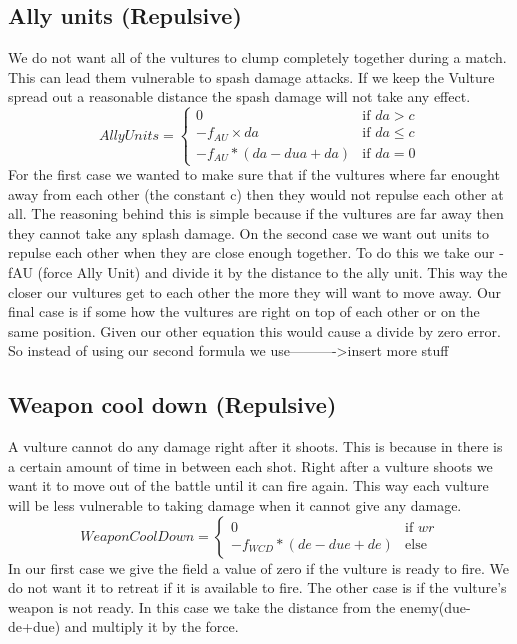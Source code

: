	\subsection*{Ally units (Repulsive)}
We do not want all of the vultures to clump completely together during a match. This can lead them vulnerable to spash damage attacks. If we keep the Vulture spread out a reasonable distance the spash damage will not take any effect.
		\begin{displaymath}
			AllyUnits = \begin{cases}
					0 & \text{if } da > c\\
					-f_{AU} \times da & \text{if } da \leq c\\
					-f_{AU} * (da - dua + da) & \text{if } da = 0
				\end{cases}		
		\end{displaymath}
	For the first case we wanted to make sure that if the vultures where far enought away from each other (the constant c) then they would not repulse each other at all. The reasoning behind this is simple because if the vultures are far away then they cannot take any splash damage.
	On the second case we want out units to repulse each other when they are close enough together. To do this we take our -fAU (force Ally Unit) and divide it by the distance to the ally unit. This way the closer our vultures get to each other the more they will want to move away.
	Our final case is if some how the vultures are right on top of each other or on the same position. Given our other equation this would cause a divide by zero error. So instead of using our second formula we use---------->insert more stuff
	\subsection*{Weapon cool down (Repulsive)}
A vulture cannot do any damage right after it shoots. This is because in there is a certain amount of time in between each shot. Right after a vulture shoots we want it to move out of the battle until it can fire again. This way each vulture will be less vulnerable to taking damage when it cannot give any damage.
		\begin{displaymath}
			WeaponCoolDown = \begin{cases}
					0 & \text{if } wr\\
					-f_{WCD} * (de - due + de) & \text{else}
				\end{cases}		
		\end{displaymath}
In our first case we give the field a value of zero if the vulture is ready to fire. We do not want it to retreat if it is available to fire.
The other case is if the vulture's weapon is not ready. In this case we take the distance from the enemy(due-de+due) and multiply it by the force.
